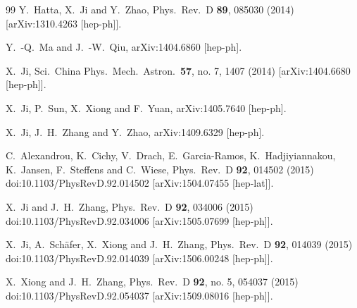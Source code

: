 \begin{thebibliography}{99}
  Y.~Hatta, X.~Ji and Y.~Zhao,
  Phys.\ Rev.\ D {\bf 89}, 085030 (2014)
  [arXiv:1310.4263 [hep-ph]].

  Y.~-Q.~Ma and J.~-W.~Qiu,
  arXiv:1404.6860 [hep-ph].

  X.~Ji,
  Sci.\ China Phys.\ Mech.\ Astron.\  {\bf 57}, no. 7, 1407 (2014)
  [arXiv:1404.6680 [hep-ph]].

  X.~Ji, P.~Sun, X.~Xiong and F.~Yuan,
  arXiv:1405.7640 [hep-ph].

  X.~Ji, J.~H.~Zhang and Y.~Zhao,
  arXiv:1409.6329 [hep-ph].

  C.~Alexandrou, K.~Cichy, V.~Drach, E.~Garcia-Ramos, K.~Hadjiyiannakou, K.~Jansen, F.~Steffens and C.~Wiese,
  Phys.\ Rev.\ D {\bf 92}, 014502 (2015)
  doi:10.1103/PhysRevD.92.014502
  [arXiv:1504.07455 [hep-lat]].

  X.~Ji and J.~H.~Zhang,
  Phys.\ Rev.\ D {\bf 92}, 034006 (2015)
  doi:10.1103/PhysRevD.92.034006
  [arXiv:1505.07699 [hep-ph]].

  X.~Ji, A.~Schäfer, X.~Xiong and J.~H.~Zhang,
  Phys.\ Rev.\ D {\bf 92}, 014039 (2015)
  doi:10.1103/PhysRevD.92.014039
  [arXiv:1506.00248 [hep-ph]].

  X.~Xiong and J.~H.~Zhang,
  Phys.\ Rev.\ D {\bf 92}, no. 5, 054037 (2015)
  doi:10.1103/PhysRevD.92.054037
  [arXiv:1509.08016 [hep-ph]].


\end{thebibliography}
